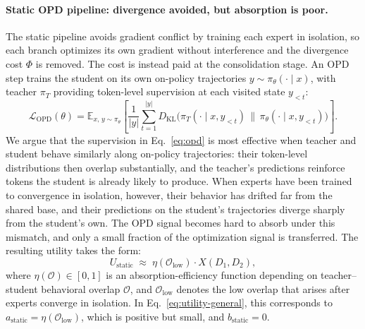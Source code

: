 \paragraph{Static OPD pipeline: divergence avoided, but absorption is poor.}
The static pipeline avoids gradient conflict by training each expert in isolation, so each branch optimizes its own gradient without interference and the divergence cost $\Phi$ is removed. The cost is instead paid at the consolidation stage. An OPD step trains the student on its own on-policy trajectories $y \sim \pi_\theta(\cdot \mid x)$, with teacher $\pi_T$ providing token-level supervision at each visited state $y_{<t}$:
\begin{equation}
\mathcal{L}_{\text{OPD}}(\theta) = \mathbb{E}_{x, \, y \sim \pi_\theta} \left[ \frac{1}{|y|} \sum_{t=1}^{|y|} D_{\mathrm{KL}}\big(\pi_T(\cdot \mid x, y_{<t}) \,\|\, \pi_\theta(\cdot \mid x, y_{<t})\big) \right].
\label{eq:opd}
\end{equation}
We argue that the supervision in Eq.~\eqref{eq:opd} is most effective when teacher and student behave similarly along on-policy trajectories: their token-level distributions then overlap substantially, and the teacher's predictions reinforce tokens the student is already likely to produce. When experts have been trained to convergence in isolation, however, their behavior has drifted far from the shared base, and their predictions on the student's trajectories diverge sharply from the student's own. The OPD signal becomes hard to absorb under this mismatch, and only a small fraction of the optimization signal is transferred. The resulting utility takes the form:
\begin{equation}
U_{\text{static}} \;\approx\; \eta(\mathcal{O}_{\text{low}}) \cdot X(D_1, D_2),
\label{eq:utility-static}
\end{equation}
where $\eta(\mathcal{O}) \in [0, 1]$ is an absorption-efficiency function depending on teacher--student behavioral overlap $\mathcal{O}$, and $\mathcal{O}_{\text{low}}$ denotes the low overlap that arises after experts converge in isolation. In Eq.~\eqref{eq:utility-general}, this corresponds to $a_{\text{static}} = \eta(\mathcal{O}_{\text{low}})$, which is positive but small, and $b_{\text{static}} = 0$.

